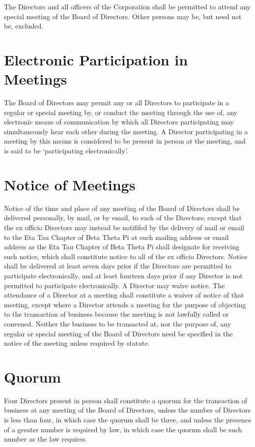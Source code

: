 The Directors and all officers of the Corporation shall be permitted to attend
any special meeting of the Board of Directors.  Other persons may be, but need
not be, excluded.

\section{Electronic Participation in Meetings}

The Board of Directors may permit any or all Directors to participate in a
regular or special meeting by, or conduct the meeting through the use of, any
electronic means of communication by which all Directors participating may
simultaneously hear each other during the meeting. A Director participating in a
meeting by this means is considered to be present in person at the meeting, and
is said to be `participating electronically'.


\section{Notice of Meetings}

Notice of the time and place of any meeting of the Board of Directors shall be
delivered personally, by mail, or by email, to each of the Directors; except
that the ex officio Directors may instead be notififed by the delivery of mail
or email to the Eta Tau Chapter of Beta Theta Pi at such mailing address or
email address as the Eta Tau Chapter of Beta Theta Pi shall designate for
receiving such notice, which shall constitute notice to all of the ex officio
Directors. Notice shall be delivered at least seven days prior if the Directors
are permitted to participate electronically, and at least fourteen days prior if
any Director is not permitted to participate electronically. A Director may
waive notice. The attendance of a Director at a meeting shall constitute a
waiver of notice of that meeting, except where a Director attends a meeting for
the purpose of objecting to the transaction of business because the meeting is
not lawfully called or convened. Neither the business to be transacted at, nor
the purpose of, any regular or special meeting of the Board of Directors need be
specified in the notice of the meeting unless required by statute.

\section{Quorum}

Four Directors present in person shall constitute a quorum for the transaction
of business at any meeting of the Board of Directors, unless the number of
Directors is less than four, in which case the quorum shall be three, and unless
the presence of a greater number is required by law, in which case the quorum
shall be such number as the law requires.

